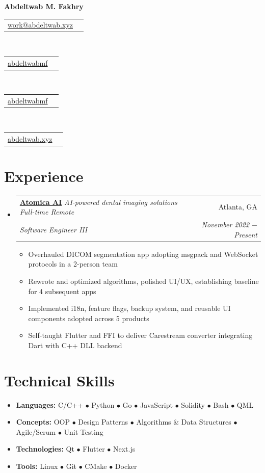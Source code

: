 \documentclass[letterpaper, 11pt]{article}
\makeatletter
\newcommand{\experience}[7] {
	\vspace{-1pt}\item[]
  \begin{tabular*}{1\textwidth}[t]{l@{\extracolsep{\fill}}r}
		#1 \href{#2}{\textbf{\color{RoyalBlue}#3}}
		\textbar{} \textit{\footnotesize#4} & #5 \\
		\textit{\small #6} & \textit{\small #7} \\
  \end{tabular*}
  \vspace{-8pt}
}
\newcommand{\subexperience}[1] {
\item\small
  {#1}
  \vspace{-2pt}
}
\newcommand{\technicalskill}[3] {
  \vspace{-1pt}
	\item[]\small
  #1 \textbf{#2: }{\footnotesize{#3}}
  \vspace{-2pt}
}
\newcommand{\contact}[4] {
  \begin{tabular}{lr}
    {\href{#1}{\color{#3} #2 #4}}
  \end{tabular}
  \vspace{-4pt}
}
\newcommand{\bulletitem}[1] {{\tiny$\bullet$} #1}
\makeatother
\begin{document}
\begin{center}
\textbf{\Huge{Abdeltwab M. Fakhry}}
\vspace{-4pt}
\end{center}

\begin{center}
  \small
  \contact
  {mailto:work@abdeltwab.xyz}
  {\faIcon{envelope}}{RoyalBlue}{work@abdeltwab.xyz}\,
  \contact
  {https://www.linkedin.com/in/abdeltwabmf}
  {\faIcon{linkedin}}{RoyalBlue}{abdeltwabmf}\,
  \contact
  {https://github.com/AbdeltwabMF}
  {\faIcon{github}}{RoyalBlue}{abdeltwabmf}\,
  \contact
  {https://abdeltwab.xyz}
  {\faIcon{globe}}{RoyalBlue}{abdeltwab.xyz}
\end{center}\vspace{8pt}

\section{Experience}
\begin{itemize}[leftmargin=0pt]
  \experience
	{\faIcon{briefcase}}
	{https://atomica.ai/}{Atomica AI}{AI-powered dental imaging solutions \textbar{} Full-time \textbar{} Remote}{Atlanta, GA}
  {Software Engineer III}{November 2022 $-$ Present}

  \begin{itemize}
    \subexperience
		{Overhauled DICOM segmentation app adopting msgpack and WebSocket protocols in a 2-person team}
    \subexperience
		{Rewrote and optimized algorithms, polished UI/UX, establishing baseline for 4 subsequent apps}
    \subexperience
		{Implemented i18n, feature flags, backup system, and reusable UI components adopted across 5 products}
    \subexperience
		{Self-taught Flutter and FFI to deliver Carestream converter integrating Dart with C++ DLL backend}
  \end{itemize}\vspace{-4pt}
\end{itemize}

\section{Technical Skills}
\begin{itemize}[leftmargin=0pt]
  \technicalskill
  {}{Languages}
	{C/C++ \bulletitem{Python} \bulletitem{Go} \bulletitem{JavaScript} \bulletitem{Solidity} \bulletitem{Bash} \bulletitem{QML}}

  \technicalskill
  {}{Concepts}
	{OOP \bulletitem{Design Patterns} \bulletitem{Algorithms \& Data Structures} \bulletitem{Agile/Scrum} \bulletitem{Unit Testing}}

  \technicalskill
  {}{Technologies}
	{Qt \bulletitem{Flutter} \bulletitem{Next.js}}

  \technicalskill
  {}{Tools}
  {Linux \bulletitem{Git} \bulletitem{CMake} \bulletitem{Docker}}
\end{itemize}
\end{document}
